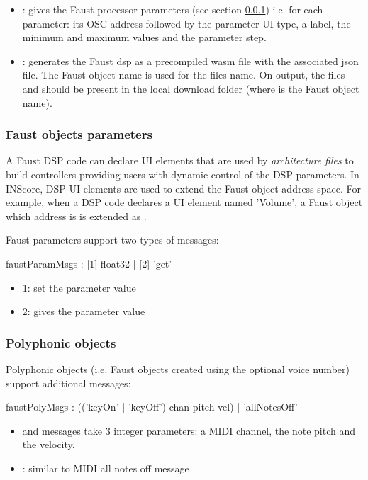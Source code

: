 \documentclass[a4paper,twoside]{article}
\newcommand{\subsublevel}[1]	{\subsubsection{#1}}
\begin{document}
\begin{itemize}
\item {}: gives the Faust processor parameters (see section \ref{webFaustParams}) i.e. for each parameter: its OSC address followed by the parameter UI type, a label, the minimum and maximum values and the parameter step.
\item {}: generates the Faust dsp as a precompiled wasm file with the associated json file. The Faust object name is used for the files name. On output, the files  and  should be present in the local download folder (where  is the Faust object name).
\end{itemize}


\subsublevel{Faust objects parameters}
\label{webFaustParams}

A Faust DSP code can declare UI elements that are used by \emph{architecture files} to build controllers providing users with dynamic control of the DSP parameters. In INScore, DSP UI elements are used to extend the Faust object address space. For example, when a DSP code declares a UI element named 'Volume', a Faust object which address is  is extended as .

Faust parameters support two types of messages:

\begin{rail}
faustParamMsgs : [1] float32 | [2] 'get'
\end{rail}

\begin{itemize}
\item 1: set the parameter value
\item 2: gives the parameter value
\end{itemize}


\subsublevel{Polyphonic objects}
\label{webFaustPoly}

Polyphonic objects (i.e. Faust objects created using the optional voice number) support additional messages:

\begin{rail}
faustPolyMsgs : (('keyOn' | 'keyOff') chan pitch vel)
				| 'allNotesOff'
\end{rail}

\begin{itemize}
\item {} and  messages take 3 integer parameters: a MIDI channel, the note pitch and the velocity.
\item {}: similar to MIDI all notes off message
\end{itemize}
\end{document}
